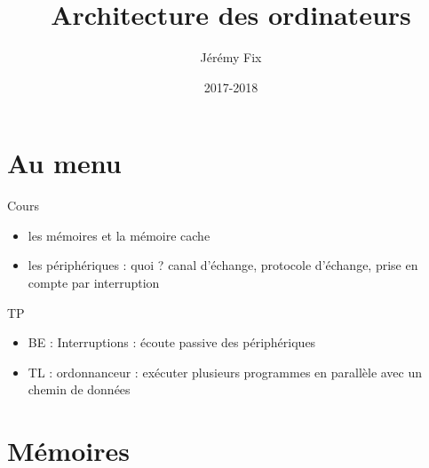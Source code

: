 \documentclass{beamer}
\title[Architecture]{Architecture des ordinateurs} %
\author{Jérémy Fix} %
\institute[CS] %
{
CentraleSupélec \\ %
\medskip
\textit{jeremy.fix@centralesupelec.fr} %
}
\date{2017-2018} %
\begin{document}
\begin{frame}
\titlepage %
\end{frame}




\section{Au menu}

\begin{frame}

\begin{block}{Cours}
\begin{itemize}
\item les mémoires et la mémoire cache
\item les périphériques : quoi ? canal d'échange, protocole d'échange, prise en compte par interruption
\end{itemize}
\end{block}

\begin{block}{TP}
\begin{itemize}
\item BE : Interruptions : écoute passive des périphériques
\item TL : ordonnanceur : exécuter plusieurs programmes en parallèle avec un chemin de données
\end{itemize}
\end{block}
\end{frame}


\section{Mémoires}
\end{document}
